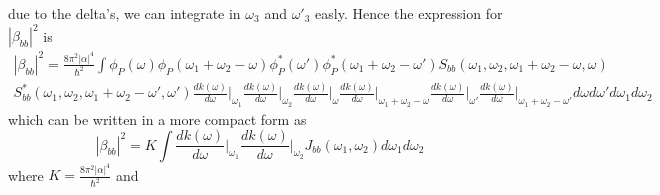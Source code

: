 due to the delta's, we can integrate in $\omega_3$ and $\omega'_3$ easly. Hence the expression for $|\beta_{bb}|^2$ is
\begin{multline}|\beta_{bb}|^2 = \frac{8\pi^2|\alpha|^4}{\hbar^2}\int \phi_P(\omega)\phi_P(\omega_1+\omega_2-\omega)\phi_P^*(\omega')\phi^*_P(\omega_1+\omega_2-\omega')S_{bb}(\omega_1,\omega_2,\omega_1+\omega_2-\omega,\omega)\\ S^*_{bb}(\omega_1,\omega_2,\omega_1+\omega_2-\omega',\omega')
\frac{dk(\omega)}{d\omega}\Bigg|_{\omega_1}\frac{dk(\omega)}{d\omega}\Bigg|_{\omega_2}\frac{dk(\omega)}{d\omega}\Bigg|_{\omega}\frac{dk(\omega)}{d\omega}\Bigg|_{\omega_1+\omega_2-\omega}\frac{dk(\omega)}{d\omega}\Bigg|_{\omega'}\frac{dk(\omega)}{d\omega}\Bigg|_{\omega_1+\omega_2-\omega'} d\omega d\omega'  d\omega_1d\omega_2\end{multline}
which can be written in a more compact form as
\[|\beta_{bb}|^2 = K\int \frac{dk(\omega)}{d\omega}\Bigg|_{\omega_1}\frac{dk(\omega)}{d\omega}\Bigg|_{\omega_2} J_{bb}(\omega_1,\omega_2)d\omega_1 d\omega_2\]
where $K = \frac{8\pi^2|\alpha|^4}{\hbar^2}$ and 

